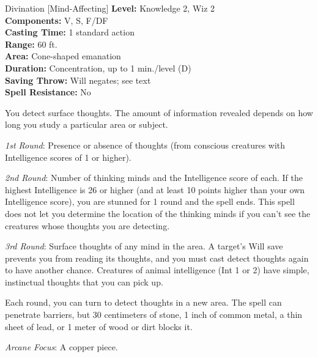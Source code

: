 {Divination [Mind-Affecting]}
{
	\textbf{Level:}
	Knowledge 2, Wiz 2\\
	\textbf{Components:}
	V, S, F/DF\\
	\textbf{Casting Time:}
	1 standard action\\
	\textbf{Range:}
	60 ft.\\
	\textbf{Area:}
	Cone-shaped emanation\\
	\textbf{Duration:}
	Concentration, up to 1 min./level (D)\\
	\textbf{Saving Throw:}
	Will negates; see text\\
	\textbf{Spell Resistance:}
	No\\
}
{
	You detect surface thoughts. The amount of information revealed depends on how long you study a particular area or subject.

	\textit{1st Round}:
	Presence or absence of thoughts (from conscious creatures with Intelligence scores of 1 or higher).

	\textit{2nd Round}:
	Number of thinking minds and the Intelligence score of each. If the highest Intelligence is 26 or higher (and at least 10 points higher than your own Intelligence score), you are stunned for 1 round and the spell ends. This spell does not let you determine the location of the thinking minds if you can't see the creatures whose thoughts you are detecting.

	\textit{3rd Round}:
	Surface thoughts of any mind in the area. A target's Will save prevents you from reading its thoughts, and you must cast detect thoughts again to have another chance. Creatures of animal intelligence (Int 1 or 2) have simple, instinctual thoughts that you can pick up.

	Each round, you can turn to detect thoughts in a new area. The spell can penetrate barriers, but 30 centimeters of stone, 1 inch of common metal, a thin sheet of lead, or 1 meter of wood or dirt blocks it.

	\textit{Arcane Focus}:
	A copper piece.

}
